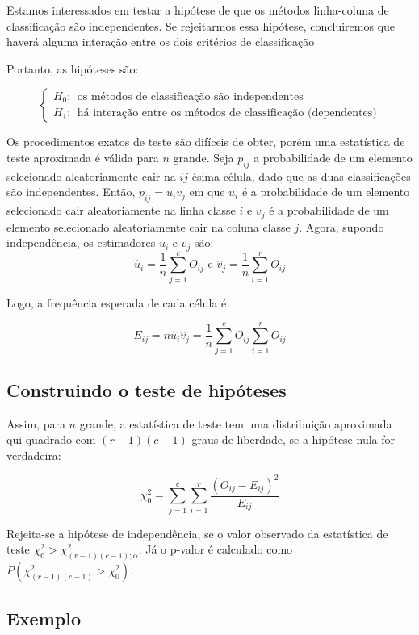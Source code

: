 \documentclass[
]{book}
\begin{document}
Estamos interessados em testar a hipótese de que os métodos linha-coluna de classificação são independentes. Se rejeitarmos essa hipótese, concluiremos que haverá alguma interação entre os dois critérios de classificação

Portanto, as hipóteses são:

\[
\begin{cases}
H_0:~~\text{os métodos de classificação são independentes}\\
H_1:~~\text{há interação entre os métodos de classificação (dependentes)}
\end{cases}
\]

Os procedimentos exatos de teste são difíceis de obter, porém uma estatística de teste aproximada é válida para \(n\) grande. Seja \(p_{ij}\) a probabilidade de um elemento selecionado aleatoriamente cair na \(ij\)-ésima célula, dado que as duas classificações são independentes. Então, \(p_{ij}=u_{i}v_{j}\) em que \(u_{i}\) é a probabilidade de um elemento selecionado cair aleatoriamente na linha classe \(i\) e \(v_j\) é a probabilidade de um elemento selecionado aleatoriamente cair na coluna classe \(j\). Agora, supondo independência, os estimadores \(u_i\) e \(v_j\) são:
\[\hat u_i=\frac{1}{n}\sum_{j=1}^cO_{ij} \text{ e } \hat v_j=\frac{1}{n}\sum_{i=1}^rO_{ij}\]

Logo, a frequência esperada de cada célula é

\[E_{ij}=n\hat u_i\hat v_j=\frac{1}{n}\sum_{j=1}^cO_{ij}\sum_{i=1}^rO_{ij}\]

\hypertarget{construindo-o-teste-de-hipuxf3teses-5}{%
\subsection{Construindo o teste de hipóteses}\label{construindo-o-teste-de-hipuxf3teses-5}}

Assim, para \(n\) grande, a estatística de teste tem uma distribuição aproximada qui-quadrado com \((r-1)(c-1)\) graus de liberdade, se a hipótese nula for verdadeira:

\[\chi^2_0=\sum_{j=1}^c\sum_{i=1}^r\frac{(O_{ij}-E_{ij})^2}{E_{ij}}\]

Rejeita-se a hipótese de independência, se o valor observado da estatística de teste \(\chi^2_0>\chi^2_{(r-1)(c-1);\alpha}\). Já o p-valor é calculado como \(P(\chi^2_{(r-1)(c-1)}>\chi^2_0)\).

\hypertarget{exemplo-8}{%
\subsection{Exemplo}\label{exemplo-8}}
\end{document}
